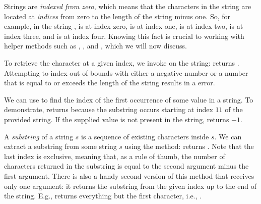 Strings are \textit{indexed from zero}, which means that the characters in the string are located at \textit{indices} from zero to the length of the string minus one. So, for example, in the string ,  is at index zero,  is at index one,  is at index two,  is at index three, and  is at index four. Knowing this fact is crucial to working with helper methods such as , , and , which we will now discuss.

\example To retrieve the character at a given index, we invoke  on the string:  returns . Attempting to index out of bounds with either a negative number or a number that is equal to or exceeds the length of the string results in a  error.

\example We can use  to find the index of the first occurrence of some value in a string. To demonstrate,  returns  because the substring  occurs starting at index $11$ of the provided string. If the supplied value is not present in the string,  returns $-1$. 

\example A \textit{substring} of a string $s$ is a sequence of existing characters inside $s$. We can extract a substring from some string $s$ using the  method:  returns . Note that the last index is exclusive, meaning that, as a rule of thumb, the number of characters returned in the substring is equal to the second argument minus the first argument. There is also a handy second version of this method that receives only one argument: it returns the substring from the given index up to the end of the string. E.g.,  returns everything but the first character, i.e., . 

